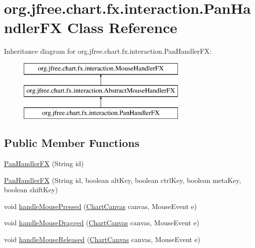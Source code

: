 \hypertarget{classorg_1_1jfree_1_1chart_1_1fx_1_1interaction_1_1_pan_handler_f_x}{}\section{org.\+jfree.\+chart.\+fx.\+interaction.\+Pan\+Handler\+FX Class Reference}
\label{classorg_1_1jfree_1_1chart_1_1fx_1_1interaction_1_1_pan_handler_f_x}
Inheritance diagram for org.\+jfree.\+chart.\+fx.\+interaction.\+Pan\+Handler\+FX\+:\begin{figure}[H]
\begin{center}
\leavevmode
\includegraphics[height=3.000000cm]{classorg_1_1jfree_1_1chart_1_1fx_1_1interaction_1_1_pan_handler_f_x}
\end{center}
\end{figure}
\subsection*{Public Member Functions}
\begin{DoxyCompactItemize}
\item 
\mbox{\hyperlink{classorg_1_1jfree_1_1chart_1_1fx_1_1interaction_1_1_pan_handler_f_x_a6bb199810bc8ca8d153e5d10d63716d2}{Pan\+Handler\+FX}} (String id)
\item 
\mbox{\hyperlink{classorg_1_1jfree_1_1chart_1_1fx_1_1interaction_1_1_pan_handler_f_x_a5ae77a35c253a032f19a1764070415c1}{Pan\+Handler\+FX}} (String id, boolean alt\+Key, boolean ctrl\+Key, boolean meta\+Key, boolean shift\+Key)
\item 
void \mbox{\hyperlink{classorg_1_1jfree_1_1chart_1_1fx_1_1interaction_1_1_pan_handler_f_x_a216c7c8b3d280c17f29bf8d55188644b}{handle\+Mouse\+Pressed}} (\mbox{\hyperlink{classorg_1_1jfree_1_1chart_1_1fx_1_1_chart_canvas}{Chart\+Canvas}} canvas, Mouse\+Event e)
\item 
void \mbox{\hyperlink{classorg_1_1jfree_1_1chart_1_1fx_1_1interaction_1_1_pan_handler_f_x_a2b6a12e23c42bf9e000720a3637fa417}{handle\+Mouse\+Dragged}} (\mbox{\hyperlink{classorg_1_1jfree_1_1chart_1_1fx_1_1_chart_canvas}{Chart\+Canvas}} canvas, Mouse\+Event e)
\item 
void \mbox{\hyperlink{classorg_1_1jfree_1_1chart_1_1fx_1_1interaction_1_1_pan_handler_f_x_ade3d5c9bd4ada9f2357231eefc89ff4e}{handle\+Mouse\+Released}} (\mbox{\hyperlink{classorg_1_1jfree_1_1chart_1_1fx_1_1_chart_canvas}{Chart\+Canvas}} canvas, Mouse\+Event e)
\end{DoxyCompactItemize}


